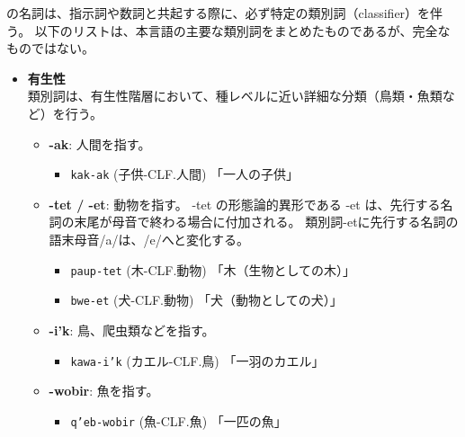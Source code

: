 \langname の名詞は、指示詞や数詞と共起する際に、必ず特定の類別詞（classifier）を伴う。
以下のリストは、本言語の主要な類別詞をまとめたものであるが、完全なものではない。

\begin{itemize}
    \item \textbf{有生性}\\
    類別詞は、有生性階層において、種レベルに近い詳細な分類（鳥類・魚類など）を行う。
        \begin{itemize}
            \item \textbf{-ak}: 人間を指す。
                \begin{itemize}
                    \item \texttt{kak-ak} (子供-CLF.人間) %
                    \quad 「一人の子供」
                \end{itemize}
            \item \textbf{-tet / -et}: 動物を指す。
            -tet の形態論的異形である -et は、先行する名詞の末尾が母音で終わる場合に付加される。
            類別詞-etに先行する名詞の語末母音/a/は、/e/へと変化する。
                \begin{itemize}
                    \item \texttt{paup-tet} (木-CLF.動物) %
                    \quad 「木（生物としての木）」
                    \item \texttt{bwe-et} (犬-CLF.動物) %
                    \quad 「犬（動物としての犬）」
                \end{itemize}
            \item \textbf{-i'k}: 鳥、爬虫類などを指す。
                \begin{itemize}
                    \item \texttt{kawa-i'k} (カエル-CLF.鳥) %
                    \quad 「一羽のカエル」
                \end{itemize}
            \item \textbf{-wobir}: 魚を指す。
                \begin{itemize}
                    \item \texttt{q'eb-wobir} (魚-CLF.魚) %
                    \quad 「一匹の魚」
                \end{itemize}
        \end{itemize}

\end{itemize}
